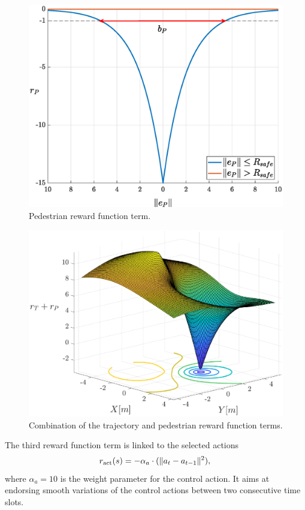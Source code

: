 \begin{figure}[ht]
	\centering
	\includegraphics[scale=0.5]{figure/Part2/Chapter5/Images/Reward_pedestrian_final.eps}
	\caption{Pedestrian reward function term.}
	\label{fig:ped_rew}
\end{figure}
\begin{figure}[ht]
	\centering
	\includegraphics[scale=0.5]{figure/Part2/Chapter5/Images/Total_3D_reward.eps}
	\caption{Combination of the trajectory and pedestrian reward function terms.}
	\label{fig:traj_rew_3D}
\end{figure}


The third reward function term is linked to the selected actions 
\begin{equation}
	r_{\rm act}(s) = - \alpha_a \cdot (\| a_t-a_{t-1} \|^2 ), \\
\end{equation} 
where $\alpha_a = 10$ is the weight parameter for the control action. It aims at endorsing smooth variations of the control actions between two consecutive time slots.


